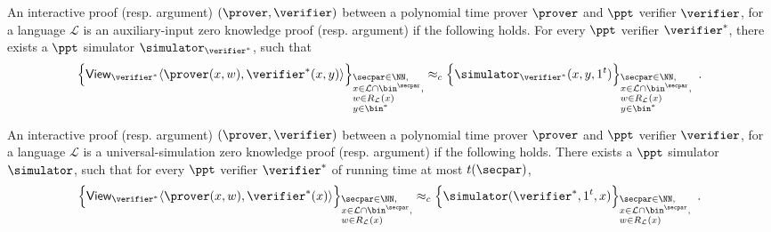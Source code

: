\begin{definition}
	An interactive proof (resp. argument) $(\prover, \verifier)$ between a polynomial time prover $\prover$ and $\ppt$ verifier $\verifier$, for a language $\mathcal{L}$ is an auxiliary-input zero knowledge proof (resp. argument) if the following holds. For every $\ppt$ verifier $\verifier^*$, there exists a $\ppt$ simulator $\simulator_{\verifier^*}$, such that 
	\[
	\Big\lbrace \view_{\verifier^{*}}\langle \prover(x,w), \verifier^{*}(x,y)\rangle \Big\rbrace_{\begin{subarray}{l}\secpar\in\NN,\\x\in \mathcal{L}\cap\bin^{\secpar},\\w \in R_\mathcal{L}(x)\\y \in \bin^*\end{subarray}} \approx_c \Big\lbrace \simulator_{\verifier^{*}}(x,y,1^t) \Big\rbrace_{\begin{subarray}{l}\secpar\in\NN,\\x\in \mathcal{L}\cap\bin^{\secpar},\\w \in R_\mathcal{L}(x)\\y \in \bin^*\end{subarray}}\enspace.
	\]		
\end{definition}
	
	


\begin{definition}
	An interactive proof (resp. argument) $(\prover, \verifier)$ between a polynomial time prover $\prover$ and $\ppt$ verifier $\verifier$, for a language $\mathcal{L}$ is a universal-simulation zero knowledge proof (resp. argument) if the following holds. There exists a $\ppt$ simulator $\simulator$, such that for every $\ppt$ verifier $\verifier^*$ of running time at most $t(\secpar)$,
	\[
	\Big\lbrace \view_{\verifier^{*}}\langle \prover(x,w), \verifier^{*}(x)\rangle \Big\rbrace_{\begin{subarray}{l}\secpar\in\NN,\\x\in \mathcal{L}\cap\bin^{\secpar},\\w \in R_\mathcal{L}(x)\end{subarray}} \approx_c \Big\lbrace \simulator(\verifier^{*},1^t,x) \Big\rbrace_{\begin{subarray}{l}\secpar\in\NN,\\x\in \mathcal{L}\cap\bin^{\secpar},\\w \in R_\mathcal{L}(x)\end{subarray}}\enspace.
	\]			
\end{definition}

